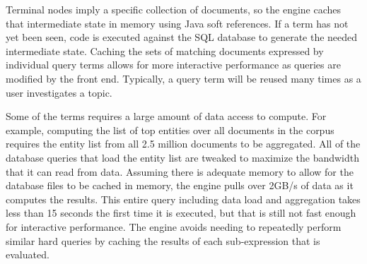 Terminal nodes imply a specific collection of documents, so the engine caches that intermediate state in memory using Java soft references.  If a term has not yet been seen, code is executed against the SQL database to generate the needed intermediate state.  Caching the sets of matching documents expressed by individual query terms allows for more interactive performance as queries are modified by the front end.  Typically, a query term will be reused many times as a user investigates a topic.

Some of the terms requires a large amount of data access to compute.  For example, computing the list of top entities over all documents in the corpus requires the entity list from all 2.5 million documents to be aggregated.  All of the database queries that load the entity list are tweaked to maximize the bandwidth that it can read from data.  Assuming there is adequate memory to allow for the database files to be cached in memory, the engine pulls over 2GB/s of data as it computes the results.  This entire query including data load and aggregation takes less than 15 seconds the first time it is executed, but that is still not fast enough for interactive performance.  The engine avoids needing to repeatedly perform similar hard queries by caching the results of each sub-expression that is evaluated.